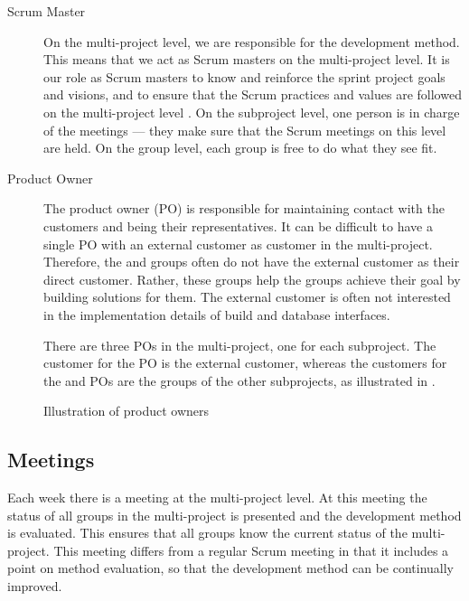 \begin{description}
  \item[Scrum Master]  On the multi-project level, we are responsible for the development method. This means that we act as Scrum masters on the multi-project level. It is our role as Scrum masters to know and reinforce the sprint project goals and visions, and to ensure that the Scrum practices and values are followed on the multi-project level \cite{larman2003}. On the subproject level, one person is in charge of the meetings --- they make sure that the Scrum meetings on this level are held. On the group level, each group is free to do what they see fit.
  \item[Product Owner] The product owner (PO) is responsible for maintaining contact with the customers and being their representatives. It can be difficult to have a single PO with an external customer as customer in the multi-project. Therefore, the \bd and \db groups often do not have the external customer as their direct customer. Rather, these groups help the \gui groups achieve their goal by building solutions for them. The external customer is often not interested in the implementation details of build and database interfaces.

There are three POs in the multi-project, one for each subproject. The customer for the \gui PO is the external customer, whereas the customers for the \db and \bd POs are the groups of the other subprojects, as illustrated in .
\end{description}

\begin{figure}%
\centering
{}
\caption{Illustration of product owners}%
\label{fig:po_illu}%
\end{figure}

\subsection{Meetings}\label{sec:meetings}
Each week there is a meeting at the multi-project level. At this meeting the status of all groups in the multi-project is presented and the development method is evaluated. This ensures that all groups know the current status of the multi-project. This meeting differs from a regular Scrum meeting in that it includes a point on method evaluation, so that the development method can be continually improved.

